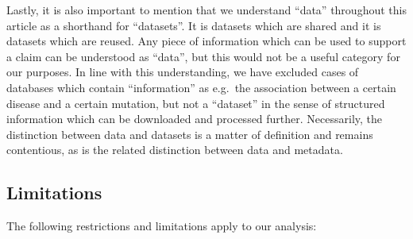 \documentclass[
  letterpaper,
  DIV=11,
  numbers=noendperiod]{scrartcl}
\begin{document}
Lastly, it is also important to mention that we understand ``data''
throughout this article as a shorthand for ``datasets''. It is datasets
which are shared and it is datasets which are reused. Any piece of
information which can be used to support a claim can be understood as
``data'', but this would not be a useful category for our purposes. In
line with this understanding, we have excluded cases of databases which
contain ``information'' as e.g.~the association between a certain
disease and a certain mutation, but not a ``dataset'' in the sense of
structured information which can be downloaded and processed further.
Necessarily, the distinction between data and datasets is a matter of
definition and remains contentious, as is the related distinction
between data and metadata.

\subsection{Limitations}\label{sec-discussion-limitations}

The following restrictions and limitations apply to our analysis:
\end{document}

